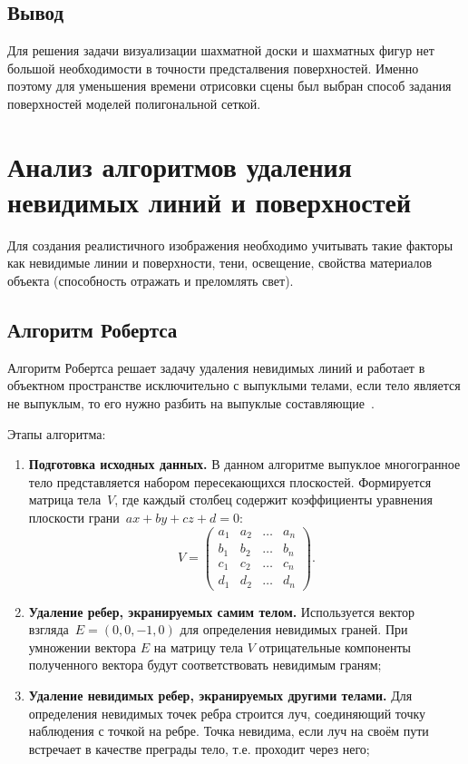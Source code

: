 \subsection*{Вывод}
Для решения задачи визуализации шахматной доски и шахматных фигур нет большой необходимости в точности предсталвения поверхностей. Именно поэтому для уменьшения времени отрисовки сцены был выбран способ задания поверхностей моделей полигональной сеткой.

\clearpage
\section{Анализ алгоритмов удаления невидимых линий и поверхностей}
Для создания реалистичного изображения необходимо учитывать такие факторы как невидимые линии и поверхности, тени, освещение, свойства материалов объекта (способность отражать и преломлять свет).

\subsection{Алгоритм Робертса}

Алгоритм Робертса решает задачу удаления невидимых линий и работает в объектном пространстве исключительно с выпуклыми телами, если тело является не выпуклым, то его нужно разбить на выпуклые составляющие~\cite{rodgersCG}.

Этапы алгоритма:
\begin{enumerate}[label=\arabic*)]
	\item \textbf{Подготовка исходных данных.} В данном алгоритме выпуклое многогранное тело представляется набором пересекающихся плоскостей. Формируется матрица тела~$V$, где каждый столбец содержит коэффициенты уравнения плоскости грани~$ax + by + cz + d = 0$:
	\begin{equation}
		V = \begin{pmatrix}
			a_{1} & a_{2} & \ldots & a_{n}\\
			b_{1} & b_{2} & \ldots & b_{n}\\
			c_{1} & c_{2} & \ldots & c_{n}\\
			d_{1} & d_{2} & \ldots & d_{n}
		\end{pmatrix}.
	\end{equation}
	\item \textbf{Удаление ребер, экранируемых самим телом.} Используется вектор взгляда~$E = (0, 0, -1, 0)$ для определения невидимых граней. При умножении вектора $E$ на матрицу тела $V$ отрицательные компоненты полученного вектора будут соответствовать невидимым граням;
	
	\item \textbf{Удаление невидимых ребер, экранируемых другими телами.} Для определения невидимых точек ребра строится луч, соединяющий точку наблюдения с точкой на ребре. Точка невидима, если луч на своём пути встречает в качестве преграды тело, т.е. проходит через него;
\end{enumerate}

